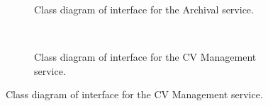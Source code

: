 \documentclass[12pt]{article}
\begin{document}
\begin{figure}[p]
\begin{subfigure}[p]{0.47\textwidth}
\centering	
{}
\caption{Class diagram of interface for the Archival service.}
\end{subfigure}
~
\begin{subfigure}[p]{0.47\textwidth}
\centering	
{}
\caption{Class diagram of interface for the CV Management service.}
\end{subfigure}


\end{figure}
\end{document}
